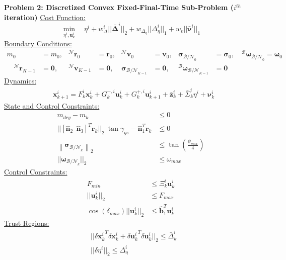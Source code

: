 \documentclass[conf]{new-aiaa}
\begin{document}
\clearpage
\begin{mdframed}
\label{problem2}
\textbf{Problem 2: Discretized Convex Fixed-Final-Time Sub-Problem ($i^{th}$ iteration)}
\underline{Cost Function:}
\begin{equation*}
\min_{\eta^i, \mathbf{u}_k^i} \quad \eta^i + w_\Delta^i || \bm{\bar{\Delta}}^i ||_2 + w_{\Delta_\eta} || \Delta_\eta^i ||_1 + w_v || \bar{\bm{\nu}}^i ||_1
\end{equation*}
%
\underline{Boundary Conditions:}  
\begin{align*}
m_0 &= m_0, &^\mathcal{N}\mathbf{r}_0 &= \mathbf{r}_0, & ^\mathcal{N}\mathbf{v}_0 &= \mathbf{v}_0, & \boldsymbol{\sigma}_{\mathcal{B/N}_0} &= {\boldsymbol{\sigma}_0}, \quad ^\mathcal{B}\boldsymbol{\omega}_{\mathcal{B/N}_0} = \boldsymbol{\omega}_0 \\
\quad ^\mathcal{N}\mathbf{r}_{K-1} &= \mathbf{0}, & ^\mathcal{N}\mathbf{v}_{K-1} &= \mathbf{0}, & \boldsymbol{\sigma}_{\mathcal{B/N}_{K-1}} &= \mathbf{0}, & ^\mathcal{B}\boldsymbol{\omega}_{\mathcal{B/N}_{K-1}} &= \mathbf{0}
\end{align*}
%
\underline{Dynamics:}  
\begin{align*}
& \mathbf{x}_{k+1}^i = F_k^i\mathbf{x}_k^i + G^{-,i}_k\mathbf{u}_k^i + G_k^{+,i}\mathbf{u}_{k+1}^i + \bar{\mathbf{z}}^i_k +\bar{\Sigma}_k^i\eta^i + \bm{\nu}_k^i
\end{align*}
%
\underline{State and Control Constraints:}
\begin{align*}
m_{dry} - m_k & \leq 0 \\
|| [\hat{\bm{n}}_2 \ \ \hat{\bm{n}}_3 ]^T \mathbf{r}_k \lvert\lvert_2 \ \tan{\gamma_{gs}}  - \hat{\bm{n}}_1^T \mathbf{r}_k & \leq 0 \\
%
\left \lVert \boldsymbol{\sigma}_{\mathcal{B/N}_k} \right \lVert_2 &\leq \tan \left( \frac{\psi_{max}}{4} \right) \\
%
|| \bm{\omega}_{\mathcal{B/N}_k} ||_2 & \leq \omega_{max}
\end{align*}
%
\underline{Control Constraints:}  
\begin{align*}
F_{min} &\leq \Xi_k^i\mathbf{u}_k^i \\
|| \mathbf{u}_k^i ||_2 &\leq F_{max} \\
\cos(\delta_{max}) || \mathbf{u}_k^i ||_2 &\leq \hat{\bm{b}}_1^T \mathbf{u}_k^i
\end{align*}
%
\underline{Trust Regions:}  
\begin{align*}
& ||{\delta \mathbf{x}_k^i}^T  \delta \mathbf{x}_k^i + {\delta \mathbf{u}_k^i}^T \delta \mathbf{u}_k^i ||_2 \leq \bar{\Delta}_k^i \\
& || \delta \eta^i ||_2 \leq \Delta_\eta^i
\end{align*}
\end{mdframed}
\end{document}
